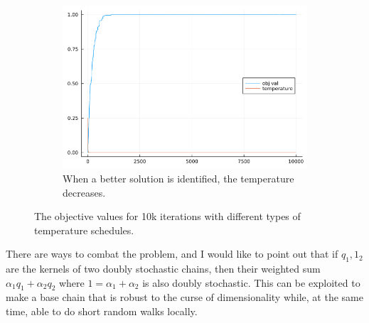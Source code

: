 \documentclass[]{article}
\theoremstyle{definition}
\begin{document}
\begin{figure}[H]
\begin{subfigure}{0.3\textwidth}
                \includegraphics[width=\textwidth]{sa_experiment3.png}
                \caption{When a better solution is identified, the temperature decreases. }
            \end{subfigure}
            \caption{The objective values for 10k iterations with different types of temperature schedules. }
            \label{fig:sa_experiments}
        \end{figure}
        There are ways to combat the problem, and I would like to point out that if $q_1, 1_2$ are the kernels of two doubly stochastic chains, then their weighted sum $\alpha_1 q_1 + \alpha_2 q_2$ where $1 = \alpha_1 + \alpha_2$ is also doubly stochastic. This can be exploited to make a base chain that is robust to the curse of dimensionality while, at the same time, able to do short random walks locally. 




\end{document}
